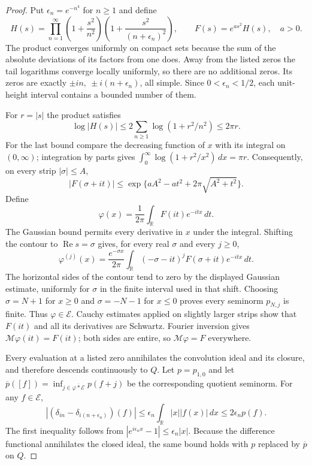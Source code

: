 \documentclass[11pt,a4paper]{article}
\begin{document}
\begin{proof}
Put $\epsilon_n=e^{-n^4}$ for $n\ge1$ and define
\[
 H(s)=\prod_{n=1}^{\infty}
       \left(1+\frac{s^2}{n^2}\right)
       \left(1+\frac{s^2}{(n+\epsilon_n)^2}\right),
 \qquad F(s)=e^{as^2}H(s),\quad a>0.
\]
The product converges uniformly on compact sets because the sum of
the absolute deviations of its factors from one does. Away from the
listed zeros the tail logarithms converge locally uniformly, so
there are no additional zeros. Its zeros are exactly
$\pm in,\ \pm i(n+\epsilon_n)$, all simple. Since
$0<\epsilon_n<1/2$, each unit-height interval contains a bounded
number of them.

For $r=|s|$ the product satisfies
\[
 \log|H(s)|\le2\sum_{n\ge1}\log(1+r^2/n^2)\le2\pi r.
\]
For the last bound compare the decreasing function of $x$ with its
integral on $(0,\infty)$; integration by parts gives
$\int_0^\infty\log(1+r^2/x^2)\,dx=\pi r$.
Consequently, on every strip $|\sigma|\le A$,
\[
 |F(\sigma+it)|
 \le \exp\{aA^2-at^2+2\pi\sqrt{A^2+t^2}\}.
\]
Define
\[
 \varphi(x)=\frac1{2\pi}\int_{\mathbb R}F(it)e^{-itx}\,dt.
\]
The Gaussian bound permits every derivative in $x$ under the integral.
Shifting the contour to $\operatorname{Re}s=\sigma$ gives, for
every real $\sigma$ and every $j\ge0$,
\[
 \varphi^{(j)}(x)
   =\frac{e^{-\sigma x}}{2\pi}
      \int_{\mathbb R}(-\sigma-it)^jF(\sigma+it)e^{-itx}\,dt.
\]
The horizontal sides of the contour tend to zero by the displayed
Gaussian estimate, uniformly for $\sigma$ in the finite interval
used in that shift. Choosing $\sigma=N+1$ for $x\ge0$ and
$\sigma=-N-1$ for $x\le0$ proves every seminorm $p_{N,j}$ is finite.
Thus $\varphi\in\mathcal E$. Cauchy estimates applied on slightly
larger strips show that $F(it)$ and all its derivatives are Schwartz.
Fourier inversion gives $\mathcal M\varphi(it)=F(it)$;
both sides are entire, so $\mathcal M\varphi=F$ everywhere.

Every evaluation at a listed zero annihilates the convolution ideal
and its closure, and therefore descends continuously to $Q$.
Let $p=p_{1,0}$ and let
$\overline p([f])=\inf_{j\in\overline{\varphi*\mathcal E}}p(f+j)$
be the corresponding quotient seminorm. For any $f\in\mathcal E$,
\[
 |(\delta_{in}-\delta_{i(n+\epsilon_n)})(f)|
  \le\epsilon_n\int_{\mathbb R}|x||f(x)|\,dx
  \le2\epsilon_n p(f).
\]
The first inequality follows from
$|e^{i\epsilon_n x}-1|\le\epsilon_n|x|$.
Because the difference functional annihilates the closed ideal,
the same bound holds with $p$ replaced by $\overline p$ on $Q$.


\end{proof}
\end{document}
